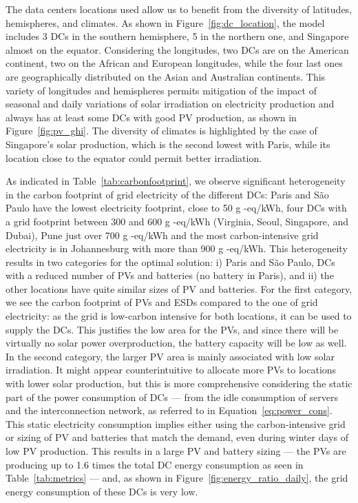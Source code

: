 The data centers locations used allow us to benefit from the diversity of latitudes, hemispheres, and climates. As shown in Figure~\ref{fig:dc_location}, the model includes 3 DCs in the southern hemisphere, 5 in the northern one, and Singapore almost on the equator. Considering the longitudes, two DCs are on the American continent, two on the African and European longitudes, while the four last ones are geographically distributed on the Asian and Australian continents. This variety of longitudes and hemispheres permits mitigation of the impact of seasonal and daily variations of solar irradiation on electricity production and always has at least some DCs with good PV production, as shown in Figure~\ref{fig:pv_ghi}. The diversity of climates is highlighted by the case of Singapore's solar production, which is the second lowest with Paris, while its location close to the equator could permit better irradiation.


As indicated in Table~\ref{tab:carbonfootprint}, we observe significant heterogeneity in the carbon footprint of grid electricity of the different DCs: Paris and S\~ao Paulo have the lowest electricity footprint, close to 50 g -eq/kWh, four DCs with a grid footprint between 300 and 600 g -eq/kWh (Virginia, Seoul, Singapore, and Dubai), Pune just over 700 g -eq/kWh and the most carbon-intensive grid electricity is in Johannesburg with more than 900 g -eq/kWh. This heterogeneity results in two categories for the optimal solution: i) Paris and S\~ao Paulo, DCs with a reduced number of PVs and batteries (no battery in Paris), and ii) the other locations have quite similar sizes of PV and batteries. For the first category, we see the carbon footprint of PVs and ESDs compared to the one of grid electricity: as the grid is low-carbon intensive for both locations, it can be used to supply the DCs. This justifies the low area for the PVs, and since there will be virtually no solar power overproduction, the battery capacity will be low as well. In the second category, the larger PV area is mainly associated with low solar irradiation. It might appear counterintuitive to allocate more PVs to locations with lower solar production, but this is more comprehensive considering the static part of the power consumption of DCs  --- from the idle consumption of servers and the interconnection network, as referred to in Equation~\eqref{eq:power_cons}. This static electricity consumption implies either using the carbon-intensive grid or sizing of PV and batteries that match the demand, even during winter days of low PV production. This results in a large PV and battery sizing --- the PVs are producing up to 1.6 times the total DC energy consumption as seen in Table~\ref{tab:metrics} --- and, as shown in Figure~\ref{fig:energy_ratio_daily}, the grid energy consumption of these DCs is very low. 

